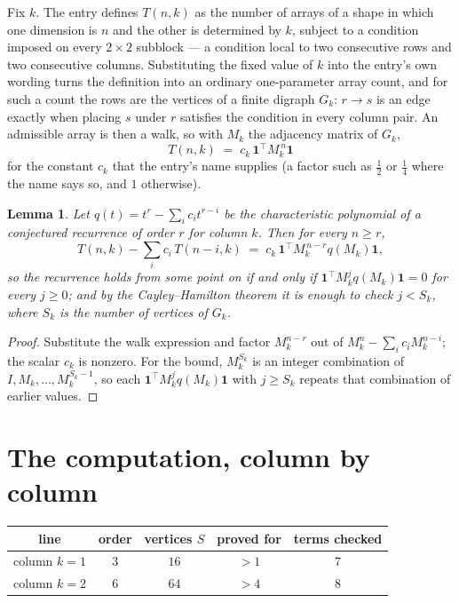 \documentclass[11pt,a4paper]{article}
\theoremstyle{plain}
\newtheorem{lemma}[theorem]{Lemma}
\theoremstyle{definition}
\begin{document}
Fix $k$. The entry defines $T(n,k)$ as the number of arrays of a shape in which one dimension
is $n$ and the other is determined by $k$, subject to a condition imposed on every
$2\times2$ subblock --- a condition local to two consecutive rows and two consecutive columns.
Substituting the fixed value of $k$ into the entry's own wording turns the definition into an
ordinary one-parameter array count, and for such a count the rows are the vertices of a finite
digraph $G_k$: $r\to s$ is an edge exactly when placing $s$ under $r$ satisfies the condition
in every column pair. An admissible array is then a walk, so with $M_k$ the adjacency matrix
of $G_k$,
\[
T(n,k)\;=\;c_k\,\mathbf{1}^{\!\top}M_k^{\,n}\mathbf{1}
\]
for the constant $c_k$ that the entry's name supplies (a factor such as $\tfrac12$ or
$\tfrac14$ where the name says so, and $1$ otherwise).

\begin{lemma}\label{lem:crit}
Let $q(t)=t^{r}-\sum_i c_it^{r-i}$ be the characteristic polynomial of a conjectured
recurrence of order $r$ for column $k$. Then for every $n\ge r$,
\[
T(n,k)-\sum_i c_i\,T(n-i,k)\;=\;c_k\,\mathbf{1}^{\!\top}M_k^{\,n-r}q(M_k)\mathbf{1},
\]
so the recurrence holds from some point on if and only if
$\mathbf{1}^{\!\top}M_k^{j}q(M_k)\mathbf{1}=0$ for every $j\ge0$; and by the
Cayley--Hamilton theorem it is enough to check $j<S_k$, where $S_k$ is the number of vertices
of $G_k$.
\end{lemma}

\begin{proof}
Substitute the walk expression and factor $M_k^{n-r}$ out of $M_k^{n}-\sum_ic_iM_k^{n-i}$;
the scalar $c_k$ is nonzero. For the bound, $M_k^{S_k}$ is an integer combination of
$I,M_k,\dots,M_k^{S_k-1}$, so each $\mathbf{1}^{\!\top}M_k^{j}q(M_k)\mathbf{1}$ with
$j\ge S_k$ repeats that combination of earlier values.
\end{proof}

\section{The computation, column by column}

\begin{center}
\begin{tabular}{ccccc}
line & order & vertices $S$ & proved for & terms checked \\ \hline
column $k$$=1$ & $3$ & $16$ & $>1$ & $7$ \\
column $k$$=2$ & $6$ & $64$ & $>4$ & $8$ \\
\end{tabular}
\end{center}
\end{document}
